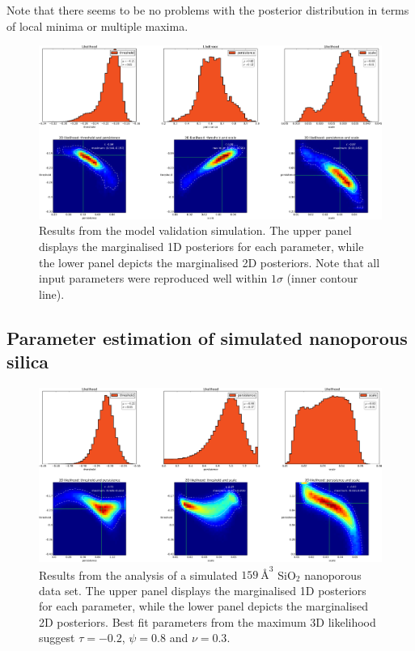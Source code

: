 \documentclass[aps,pre,twocolumn,letterpaper,floatfix,showpacs]{revtex4}
\begin{document}
Note that there seems to be no problems with the posterior distribution in terms of local minima or multiple maxima. 

\begin{figure}
\includegraphics[width=.99\textwidth]{mock_data_results_pts.png}
\caption{Results from the model validation simulation. The upper panel displays the marginalised 1D posteriors for each parameter, while the lower panel depicts the marginalised 2D posteriors. Note that all input parameters were reproduced well within $1\sigma$ (inner contour line).}
\label{fig:mockdataresults_pts}
\end{figure}

\subsection{Parameter estimation of simulated nanoporous silica}
\begin{figure}
\includegraphics[width=.99\textwidth]{results_porous_full.png}
\caption{
Results from the analysis of a simulated $\SI{159} {\angstrom}^3$ SiO$_2$ nanoporous data set. The upper panel displays the marginalised 1D posteriors for each parameter, while the lower panel depicts the marginalised 2D posteriors. Best fit parameters from the maximum 3D likelihood suggest $\tau=-0.2$, $\psi=0.8$ and $\nu=0.3$.
}

\label{fig:porous_results1}
\end{figure}
\end{document}
